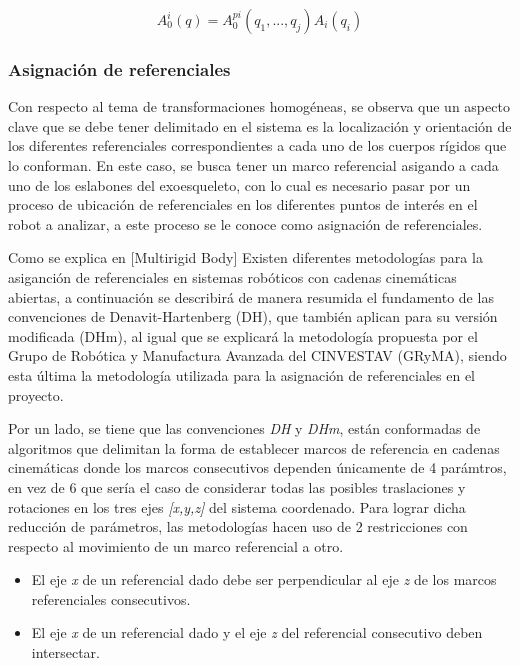         \begin{equation}
            A^i_0(q) =  A^{pi}_0(q_1,...,q_j)A_i(q_i)
            \label{eq:CD}
        \end{equation}

    \subsubsection{Asignación de referenciales}
        Con respecto al tema de transformaciones homogéneas, se observa que un 
        aspecto clave que se debe tener delimitado en el sistema es la localización 
        y orientación de los diferentes referenciales correspondientes a cada uno de 
        los cuerpos rígidos que lo conforman. En este caso, se busca tener un marco 
        referencial asigando a cada uno de los eslabones del exoesqueleto, con lo cual es 
        necesario pasar por un proceso de ubicación de referenciales en los diferentes 
        puntos de interés en el robot a analizar, a este proceso se le conoce como 
        asignación de referenciales.

        Como se explica en [Multirigid Body] Existen diferentes metodologías para la asiganción 
        de referenciales en sistemas robóticos con cadenas cinemáticas abiertas, a 
        continuación se describirá de manera resumida el fundamento de las convenciones de 
        Denavit-Hartenberg (DH), que también aplican para su versión modificada (DHm), 
        al igual que se explicará la metodología propuesta por el Grupo de Robótica y 
        Manufactura Avanzada del CINVESTAV (GRyMA), siendo esta última la metodología 
        utilizada para la asignación de referenciales en el proyecto.

        Por un lado, se tiene que las convenciones \emph{DH} y \emph{DHm}, están conformadas 
        de algoritmos que delimitan la forma de establecer marcos de referencia en 
        cadenas cinemáticas donde los marcos consecutivos dependen únicamente de 4 parámtros, 
        en vez de 6 que sería el caso de considerar todas las posibles traslaciones y rotaciones 
        en los tres ejes \emph{[x,y,z]} del sistema coordenado. Para lograr dicha reducción de 
        parámetros, las metodologías hacen uso de 2 restricciones con respecto al movimiento de 
        un marco referencial a otro.

        \begin{itemize}
            \item El eje \emph{x} de un referencial dado debe ser perpendicular al eje \emph{z} de los marcos referenciales consecutivos.
            \item El eje \emph{x} de un referencial dado y el eje \emph{z} del referencial consecutivo deben intersectar.
        \end{itemize}

